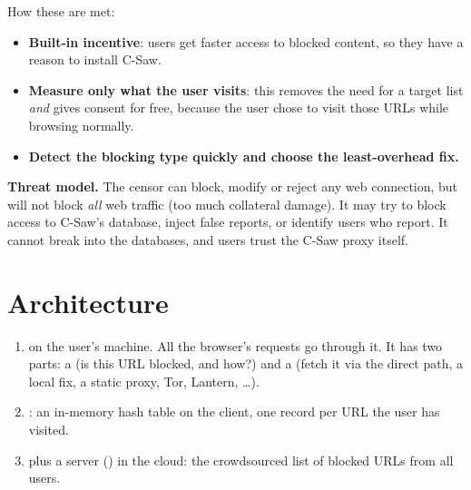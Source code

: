 How these are met:
\begin{itemize}
  \item \textbf{Built-in incentive}: users get faster access to blocked content, so they have a reason to install C-Saw.
  \item \textbf{Measure only what the user visits}: this removes the need for a target list \emph{and} gives consent for free, because the
        user chose to visit those URLs while browsing normally.
  \item \textbf{Detect the blocking type quickly and choose the least-overhead fix.}
\end{itemize}

\textbf{Threat model.} The censor can block, modify or reject any web connection, but will not block \emph{all} web traffic (too much
collateral damage). It may try to block access to C-Saw's database, inject false reports, or identify users who report. It cannot break
into the databases, and users trust the C-Saw proxy itself.

\section{Architecture}


\begin{enumerate}
  \item {} on the user's machine. All the browser's requests go through it. It has two parts: a  (is this URL blocked, and how?) and a  (fetch it via the direct path, a local fix, a static proxy,
        Tor, Lantern, \dots).
  \item {}: an in-memory hash table on the client, one record per URL the user has visited.
  \item {} plus a server () in the cloud: the crowdsourced list of blocked URLs from all users.
\end{enumerate}

